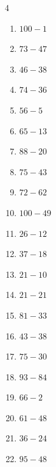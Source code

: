 \begin{multicols}{4}
\begin{enumerate}
  \item $100-1$
        \phantom{$=99$}

  \item $73-47$
        \phantom{$=26$}

  \item $46-38$
        \phantom{$=8$}

  \item $74-36$
        \phantom{$=38$}

  \item $56-5$
        \phantom{$=51$}

  \item $65-13$
        \phantom{$=52$}

  \item $88-20$
        \phantom{$=68$}

  \item $75-43$
        \phantom{$=32$}

  \item $72-62$
        \phantom{$=10$}

  \item $100-49$
        \phantom{$=51$}

  \item $26-12$
        \phantom{$=14$}

  \item $37-18$
        \phantom{$=19$}

  \item $21-10$
        \phantom{$=11$}

  \item $21-21$
        \phantom{$=0$}

  \item $81-33$
        \phantom{$=48$}

  \item $43-38$
        \phantom{$=5$}

  \item $75-30$
        \phantom{$=45$}

  \item $93-84$
        \phantom{$=9$}

  \item $66-2$
        \phantom{$=64$}

  \item $61-48$
        \phantom{$=13$}

  \item $36-24$
        \phantom{$=12$}

  \item $95-48$
        \phantom{$=47$}


\end{enumerate}
\end{multicols}
